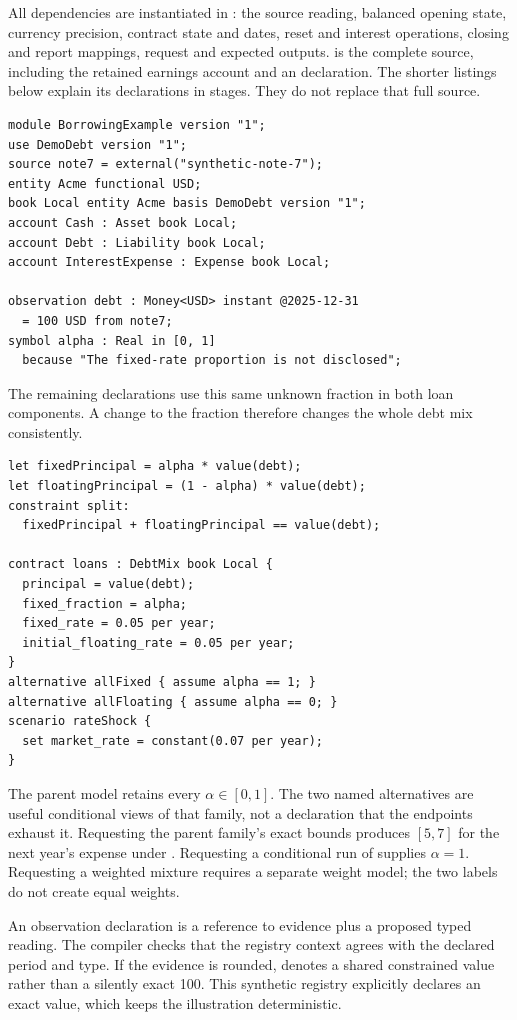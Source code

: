 All dependencies are instantiated in
: the source reading, balanced opening
state, currency precision, contract state and dates, reset and interest
operations, closing and report mappings, request and expected outputs.
 is the complete source, including the retained
earnings account and an  declaration. The shorter listings below
explain its declarations in stages. They do not replace that full source.

\begin{lstlisting}
module BorrowingExample version "1";
use DemoDebt version "1";
source note7 = external("synthetic-note-7");
entity Acme functional USD;
book Local entity Acme basis DemoDebt version "1";
account Cash : Asset book Local;
account Debt : Liability book Local;
account InterestExpense : Expense book Local;

observation debt : Money<USD> instant @2025-12-31
  = 100 USD from note7;
symbol alpha : Real in [0, 1]
  because "The fixed-rate proportion is not disclosed";
\end{lstlisting}

The remaining declarations use this same unknown fraction in both loan
components. A change to the fraction therefore changes the whole debt mix
consistently.

\begin{lstlisting}
let fixedPrincipal = alpha * value(debt);
let floatingPrincipal = (1 - alpha) * value(debt);
constraint split:
  fixedPrincipal + floatingPrincipal == value(debt);

contract loans : DebtMix book Local {
  principal = value(debt);
  fixed_fraction = alpha;
  fixed_rate = 0.05 per year;
  initial_floating_rate = 0.05 per year;
}
alternative allFixed { assume alpha == 1; }
alternative allFloating { assume alpha == 0; }
scenario rateShock {
  set market_rate = constant(0.07 per year);
}
\end{lstlisting}

The parent model retains every $\alpha\in[0,1]$. The two named alternatives
are useful conditional views of that family, not a declaration that the
endpoints exhaust it. Requesting the parent family's exact bounds produces
$[5,7]$ for the next year's expense under . Requesting a
conditional run of  supplies $\alpha=1$. Requesting a weighted
mixture requires a separate weight model; the two labels do not create equal
weights.

An observation declaration is a reference to evidence plus a proposed typed
reading. The compiler checks that the registry context agrees with the declared
period and type. If the evidence is rounded,  denotes a
shared constrained value rather than a silently exact 100. This synthetic
registry explicitly declares an exact value, which keeps the illustration
deterministic.

